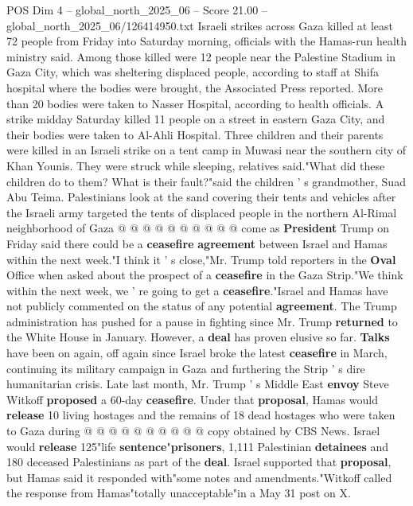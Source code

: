 \begin{textsample}{POS Dim 4 – global\_north\_2025\_06 – Score 21.00 – global\_north\_2025\_06/126414950.txt}  \label{ex:f4_pos_396}
Israeli strikes across Gaza killed at least 72 people from Friday into Saturday morning, officials with the Hamas-run health ministry said.
Among those killed were 12 people near the Palestine Stadium in Gaza City, which was sheltering displaced people, according to staff at Shifa hospital where the bodies were brought, the Associated Press reported.
More than 20 bodies were taken to Nasser Hospital, according to health officials.
A strike midday Saturday killed 11 people on a street in eastern Gaza City, and their bodies were taken to Al-Ahli Hospital.
Three children and their parents were killed in an Israeli strike on a tent camp in Muwasi near the southern city of Khan Younis.
They were struck while sleeping, relatives said."What did these children do to them?
What is their fault?"said the children ' s grandmother, Suad Abu Teima.
Palestinians look at the sand covering their tents and vehicles after the Israeli army targeted the tents of displaced people in the northern Al-Rimal neighborhood of Gaza @ @ @ @ @ @ @ @ @ @ come as \textbf{President} Trump on Friday said there could be a \textbf{ceasefire} \textbf{agreement} between Israel and Hamas within the next week."I think it ' s close,"Mr.
Trump told reporters in the \textbf{Oval} Office when asked about the prospect of a \textbf{ceasefire} in the Gaza Strip."We think within the next week, we ' re going to get a \textbf{ceasefire}."Israel and Hamas have not publicly commented on the status of any potential \textbf{agreement}.
The Trump administration has pushed for a pause in fighting since Mr.
Trump \textbf{returned} to the White House in January.
However, a \textbf{deal} has proven elusive so far. \textbf{Talks} have been on again, off again since Israel broke the latest \textbf{ceasefire} in March, continuing its military campaign in Gaza and furthering the Strip ' s dire humanitarian crisis.
Late last month, Mr.
Trump ' s Middle East \textbf{envoy} Steve Witkoff \textbf{proposed} a 60-day \textbf{ceasefire}.
Under that \textbf{proposal}, Hamas would \textbf{release} 10 living hostages and the remains of 18 dead hostages who were taken to Gaza during @ @ @ @ @ @ @ @ @ @ copy obtained by CBS News.
Israel would \textbf{release} 125"life \textbf{sentence}"\textbf{prisoners}, 1,111 Palestinian \textbf{detainees} and 180 deceased Palestinians as part of the \textbf{deal}.
Israel supported that \textbf{proposal}, but Hamas said it responded with"some notes and amendments."Witkoff called the response from Hamas"totally unacceptable"in a May 31 post on X.

\end{textsample}
